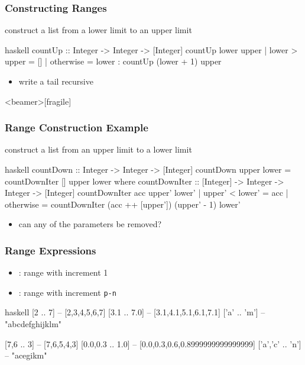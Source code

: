 \documentclass[dvipsnames]{beamer}
\theoremstyle{plain}
\begin{document}
\begin{frame}[fragile]
  \frametitle{Constructing Ranges}

  \begin{exampleblock}{construct a list from a lower limit to an upper limit}
    \begin{pygments}{haskell}
countUp :: Integer -> Integer -> [Integer]
countUp lower upper
  | lower > upper = []
  | otherwise     = lower : countUp (lower + 1) upper
    \end{pygments}
  \end{exampleblock}

  \pause
  \begin{itemize}
    \item write a tail recursive 
  \end{itemize}
\end{frame}

\begin{frame}<beamer>[fragile]
  \frametitle{Range Construction Example}

  \begin{footnotesize}
    \begin{exampleblock}{construct a list from an upper limit to a lower limit}
      \begin{pygments}{haskell}
countDown :: Integer -> Integer -> [Integer]
countDown upper lower = countDownIter [] upper lower
  where
    countDownIter :: [Integer] -> Integer -> Integer -> [Integer]
    countDownIter acc upper' lower'
      | upper' < lower' = acc
      | otherwise       = countDownIter (acc ++ [upper'])
                                        (upper' - 1) lower'
    \end{pygments}
    \end{exampleblock}
  \end{footnotesize}

  \pause
  \begin{itemize}
    \item can any of the parameters be removed?
  \end{itemize}
\end{frame}

\begin{frame}[fragile]
  \frametitle{Range Expressions}

  \begin{itemize}
    \item {}: range with increment 1
    \item {}: range with increment \texttt{p-n}
  \end{itemize}

  \begin{exampleblock}{}
    \begin{pygments}{haskell}
[2 .. 7]          -- [2,3,4,5,6,7]
[3.1 .. 7.0]      -- [3.1,4.1,5.1,6.1,7.1]
['a' .. 'm']      -- "abcdefghijklm"

[7,6 .. 3]        -- [7,6,5,4,3]
[0.0,0.3 .. 1.0]  -- [0.0,0.3,0.6,0.8999999999999999]
['a','c' .. 'n']  -- "acegikm"
    \end{pygments}
  \end{exampleblock}
\end{frame}
\end{document}
